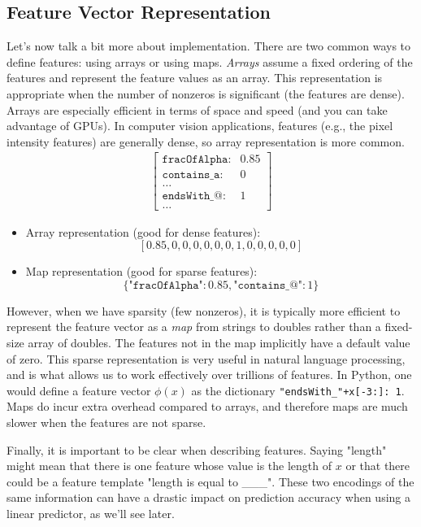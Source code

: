 
\subsection{Feature Vector Representation} %
\label{sub:feature_vector_representation}
Let's now talk a bit more about implementation.
There are two common ways to define features: using arrays or using maps.
% 
\textit{Arrays} assume a fixed ordering of the features and represent the feature values as an array.
This representation is appropriate when the number of nonzeros is significant (the features are dense).
Arrays are especially efficient in terms of space and speed (and you can take advantage of GPUs).
In computer vision applications, features (e.g., the pixel intensity features)
are generally dense, so array representation is more common.
\begin{align*}
\begin{bmatrix}
	\texttt{fracOfAlpha}: & 0.85\\
	\texttt{contains\_a}: & 0\\
	\ldots\\
	\texttt{endsWith\_@}: & 1\\
	\ldots
\end{bmatrix}
\end{align*}
\begin{itemize}
	\item Array representation (good for dense features):
	\[
		[0.85, 0, 0, 0, 0, 0, 0, 1, 0, 0, 0, 0, 0]
	\]
	\item Map representation (good for sparse features):
	\[
		\{\texttt{"fracOfAlpha"}: 0.85, \texttt{"contains\_@"}: 1\}
	\]
\end{itemize}

However, when we have sparsity (few nonzeros),
it is typically more efficient to represent the feature vector as a \textit{map} from strings to doubles
rather than a fixed-size array of doubles.
The features not in the map implicitly have a default value of zero.
This sparse representation is very useful in natural language processing,
and is what allows us to work effectively over trillions of features.
In Python, one would define a feature vector $\phi(x)$ as the dictionary \texttt{"endsWith\_"+x[-3:]: 1}.
Maps do incur extra overhead compared to arrays, and therefore maps are much slower when the features are not sparse.

Finally, it is important to be clear when describing features.
Saying "length" might mean that there is one feature whose value is the length of $x$
or that there could be a feature template "length is equal to \_\_\_".
These two encodings of the same information can have a drastic impact on prediction accuracy when using a linear predictor,
as we'll see later.

